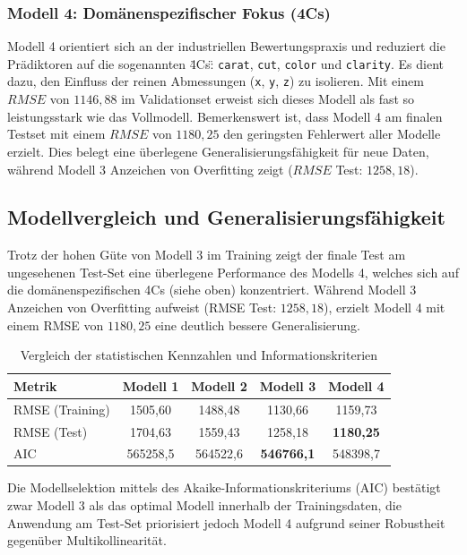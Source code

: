 \subsubsection{Modell 4: Domänenspezifischer Fokus (4Cs)}
Modell 4 orientiert sich an der industriellen Bewertungspraxis und reduziert die Prädiktoren auf die sogenannten \cite{noauthor_why_nodate}\"4Cs\": \texttt{carat}, \texttt{cut}, \texttt{color} und \texttt{clarity}. Es dient dazu, den Einfluss der reinen Abmessungen (\texttt{x}, \texttt{y}, \texttt{z}) zu isolieren. Mit einem $RMSE$ von $1146,88$ im Validationset erweist sich dieses Modell als fast so leistungsstark wie das Vollmodell. Bemerkenswert ist, dass Modell 4 am finalen Testset mit einem $RMSE$ von $1180,25$ den geringsten Fehlerwert aller Modelle erzielt. Dies belegt eine überlegene Generalisierungsfähigkeit für neue Daten, während Modell 3 Anzeichen von Overfitting zeigt ($RMSE$ Test: $1258,18$).


\subsection{Modellvergleich und Generalisierungsfähigkeit}
Trotz der hohen Güte von Modell 3 im Training zeigt der finale Test am ungesehenen Test-Set eine überlegene Performance des Modells 4, welches sich auf die domänenspezifischen 4Cs (siehe oben) konzentriert. Während Modell 3 Anzeichen von Overfitting aufweist (RMSE Test: $1258,18$), erzielt Modell 4 mit einem RMSE von $1180,25$ eine deutlich bessere Generalisierung.

\begin{table}[h]
\centering
\caption{Vergleich der statistischen Kennzahlen und Informationskriterien}
\begin{tabular}{lcccc}
\hline
\textbf{Metrik} & \textbf{Modell 1} & \textbf{Modell 2} & \textbf{Modell 3} & \textbf{Modell 4} \\ \hline
RMSE (Training) & 1505,60 & 1488,48 & 1130,66 & 1159,73 \\
RMSE (Test) & 1704,63 & 1559,43 & 1258,18 & \textbf{1180,25} \\
AIC & 565258,5 & 564522,6 & \textbf{546766,1} & 548398,7 \\ \hline
\end{tabular}
\end{table}

Die Modellselektion mittels des Akaike-Informationskriteriums (AIC) bestätigt zwar Modell 3 als das optimal  Modell innerhalb der Trainingsdaten, die Anwendung am Test-Set priorisiert jedoch Modell 4 aufgrund seiner Robustheit gegenüber Multikollinearität.

